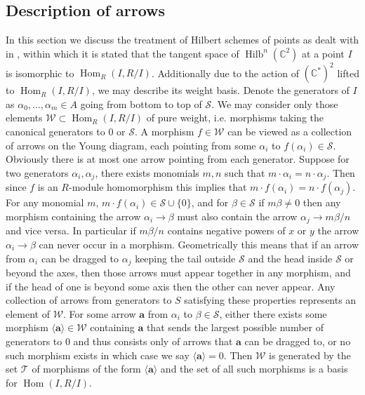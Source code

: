 \documentclass[a4page]{article}
\def\Hilb{\operatorname{Hilb}}
\def\Hom{\operatorname{Hom}}
\theoremstyle{definition}
\def\S{\mathcal{S}}
\def\W{\mathcal{W}}
\def\a{\mathbf{a}}
\begin{document}
\subsection{Description of arrows}
In this section we discuss the treatment of Hilbert schemes of points as dealt with in \cite{nested_schemes}, within which it is stated that the tangent space of $ \Hilb^{n}(\mathbb{C}^{2}) $ at a point $I$ is isomorphic to $ \Hom_{R}(I,R/I) $.
Additionally due to the action of $ (\mathbb{C}^{*})^{2} $ lifted to $ \Hom_{R}(I,R/I) $, we may describe its weight basis.
Denote the generators of $I$ as $ \alpha_{0}, \dots, \alpha_{m} \in A $ going from bottom to top of $ \mathcal{S}$.
We may consider only those elements $ \mathcal{W} \subset \Hom_{R}(I,R/I) $ of pure weight, i.e. morphisms taking the canonical generators to $0$ or $ \mathcal{S} $.
A morphism $f \in \mathcal{W}$ can be viewed as a collection of arrows on the Young diagram, each pointing from some $\alpha_i$ to $f(\alpha_i) \in \S$.
Obviously there is at most one arrow pointing from each generator.
Suppose for two generators $ \alpha_{i}, \alpha_{j}$, there exists monomials $ m,n $ such that $ m \cdot \alpha_{i} = n \cdot \alpha_{j}$.
Then since $f$ is an $R$-module homomorphism this implies that $ m \cdot f(\alpha_{i}) = n \cdot f(\alpha_{j}) $.
For any monomial $m$, $m\cdot f(\alpha_i) \in \S \cup \{0\}$, and for $\beta \in \S$ if $m\beta \neq 0$ then any morphism containing the arrow $\alpha_i \to \beta$ must also contain the arrow $\alpha_j \to m\beta /n$ and vice versa.
In particular if $m\beta/n$ contains negative powers of $x$ or $y$ the arrow $\alpha_i \to \beta$ can never occur in a morphism.
Geometrically this means that if an arrow from $\alpha_i$ can be dragged to $\alpha_j$ keeping the tail outside $\S$ and the head inside $\S$ or beyond the axes,
then those arrows must appear together in any morphism, and if the head of one is beyond some axis then the other can never appear.
Any collection of arrows from generators to $S$ satisfying these properties represents an element of $\W$.
For some arrow $\a$ from $\alpha_i$ to $\beta \in \S$, either there exists some morphism $\langle \a \rangle \in \W$ containing $\a$
that sends the largest possible number of generators to $0$ and thus consists only of arrows that $\a$ can be dragged to, or no such morphism exists in which case we say $\langle\a\rangle=0$.
Then $\W$ is generated by the set $\mathcal{T}$ of morphisms of the form $\langle\a\rangle$ and the set of all such morphisms is a basis for $\Hom(I,R/I)$.
\end{document}
